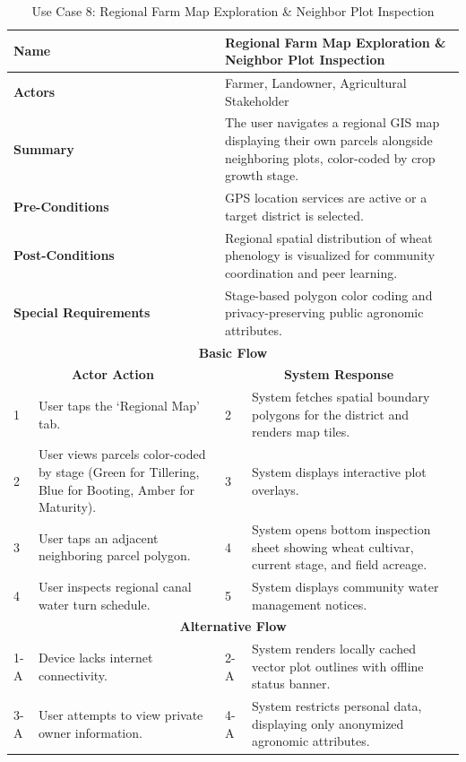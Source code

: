 \begin{table}[H]
\small
\centering
\caption{Use Case 8: Regional Farm Map Exploration \& Neighbor Plot Inspection}
\label{tab:uc8}
\begin{tabular}{|p{0.6cm}|p{6.4cm}|p{0.8cm}|p{6.6cm}|}
\hline
\multicolumn{2}{|p{7.0cm}|}{\textbf{Name}} & \multicolumn{2}{p{7.4cm}|}{Regional Farm Map Exploration \& Neighbor Plot Inspection} \\ \hline
\multicolumn{2}{|p{7.0cm}|}{\textbf{Actors}} & \multicolumn{2}{p{7.4cm}|}{Farmer, Landowner, Agricultural Stakeholder} \\ \hline
\multicolumn{2}{|p{7.0cm}|}{\textbf{Summary}} & \multicolumn{2}{p{7.4cm}|}{The user navigates a regional GIS map displaying their own parcels alongside neighboring plots, color-coded by crop growth stage.} \\ \hline
\multicolumn{2}{|p{7.0cm}|}{\textbf{Pre-Conditions}} & \multicolumn{2}{p{7.4cm}|}{GPS location services are active or a target district is selected.} \\ \hline
\multicolumn{2}{|p{7.0cm}|}{\textbf{Post-Conditions}} & \multicolumn{2}{p{7.4cm}|}{Regional spatial distribution of wheat phenology is visualized for community coordination and peer learning.} \\ \hline
\multicolumn{2}{|p{7.0cm}|}{\textbf{Special Requirements}} & \multicolumn{2}{p{7.4cm}|}{Stage-based polygon color coding and privacy-preserving public agronomic attributes.} \\ \hline
\multicolumn{4}{|c|}{\textbf{Basic Flow}} \\ \hline
\multicolumn{2}{|c|}{\textbf{Actor Action}} & \multicolumn{2}{c|}{\textbf{System Response}} \\ \hline
1 & User taps the `Regional Map' tab. & 2 & System fetches spatial boundary polygons for the district and renders map tiles. \\ \hline
2 & User views parcels color-coded by stage (Green for Tillering, Blue for Booting, Amber for Maturity). & 3 & System displays interactive plot overlays. \\ \hline
3 & User taps an adjacent neighboring parcel polygon. & 4 & System opens bottom inspection sheet showing wheat cultivar, current stage, and field acreage. \\ \hline
4 & User inspects regional canal water turn schedule. & 5 & System displays community water management notices. \\ \hline
\multicolumn{4}{|c|}{\textbf{Alternative Flow}} \\ \hline
1-A & Device lacks internet connectivity. & 2-A & System renders locally cached vector plot outlines with offline status banner. \\ \hline
3-A & User attempts to view private owner information. & 4-A & System restricts personal data, displaying only anonymized agronomic attributes. \\ \hline
\end{tabular}
\end{table}

